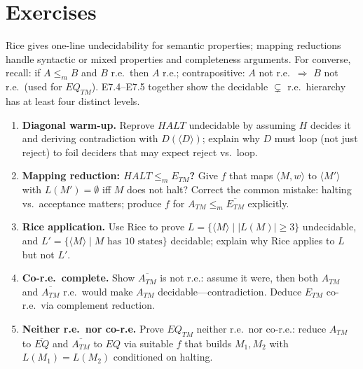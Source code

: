 \section{Exercises}
\label{sec:ch07-exercises}
Rice gives one-line undecidability for semantic properties; mapping reductions handle syntactic or mixed properties and completeness arguments.
For converse, recall: if $A\le_m B$ and $B$ r.e.\ then $A$ r.e.; contrapositive: $A$ not r.e.\ $\Rightarrow$ $B$ not r.e.\ (used for $EQ_{TM}$).
E7.4--E7.5 together show the decidable $\subsetneq$ r.e.\ hierarchy has at least four distinct levels.
\begin{enumerate}[label=E7.\arabic*, leftmargin=*, itemsep=0.8em]
\item \textbf{Diagonal warm-up.} Reprove $HALT$ undecidable by assuming $H$ decides it and deriving contradiction with $D(\langle D\rangle)$; explain why $D$ must loop (not just reject) to foil deciders that may expect reject vs.\ loop.
\item \textbf{Mapping reduction: $HALT\le_m E_{TM}$?} Give $f$ that maps $\langle M,w\rangle$ to $\langle M'\rangle$ with $L(M')=\emptyset$ iff $M$ does not halt? Correct the common mistake: halting vs.\ acceptance matters; produce $f$ for $A_{TM}\le_m\overline{E_{TM}}$ explicitly.
\item \textbf{Rice application.} Use Rice to prove $L=\{\langle M\rangle\mid |L(M)|\ge3\}$ undecidable, and $L'=\{\langle M\rangle\mid M\text{ has }10\text{ states}\}$ decidable; explain why Rice applies to $L$ but not $L'$.
\item \textbf{Co-r.e.\ complete.} Show $\overline{A_{TM}}$ is not r.e.: assume it were, then both $A_{TM}$ and $\overline{A_{TM}}$ r.e.\ would make $A_{TM}$ decidable---contradiction. Deduce $E_{TM}$ co-r.e.\ via complement reduction.
\item \textbf{Neither r.e.\ nor co-r.e.} Prove $EQ_{TM}$ neither r.e.\ nor co-r.e.: reduce $A_{TM}$ to $\overline{EQ}$ and $\overline{A_{TM}}$ to $EQ$ via suitable $f$ that builds $M_1,M_2$ with $L(M_1)=L(M_2)$ conditioned on halting.
\end{enumerate}
